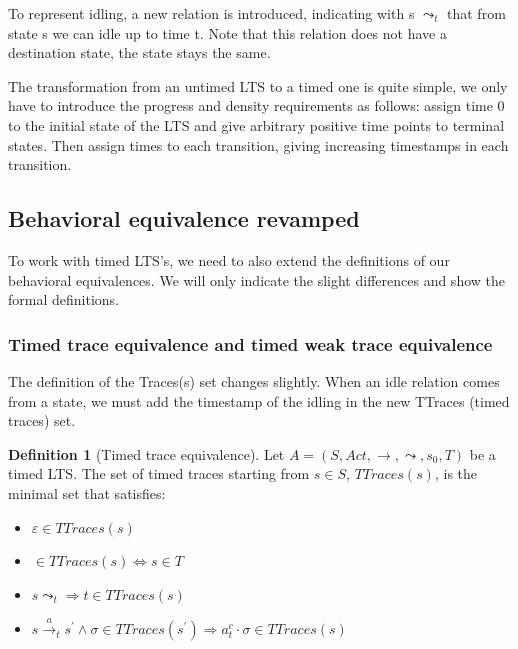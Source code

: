 \documentclass[11pt]{article}
\newcommand{\cmark}{\ding{51}}
\theoremstyle{definition}
\newtheorem{definition}{Definition}
\theoremstyle{plain}
\begin{document}
To represent idling, a new relation is introduced, indicating with s $ \leadsto_{t} $ that from state s we can idle up to time t. Note that this relation does not have a destination state, the state stays the same.

The transformation from an untimed LTS to a timed one is quite simple, we only have to introduce the progress and density requirements as follows: assign time 0 to the initial state of the LTS and give arbitrary positive time points to terminal states. Then assign times to each transition, giving increasing timestamps in each transition.

\subsection{Behavioral equivalence revamped}

To work with timed LTS's, we need to also extend the definitions of our behavioral equivalences. We will only indicate the slight differences and show the formal definitions.

\subsubsection{Timed trace equivalence and timed weak trace equivalence}

The definition of the Traces(s) set changes slightly. When an idle relation comes from a state, we must add the timestamp of the idling in the new TTraces (timed traces) set.

\begin{definition} [Timed trace equivalence]
	Let $ A = (S, Act, \rightarrow, \leadsto, s_0, T) $ be a timed LTS. The set of timed traces starting from $ s \in S$, $ TTraces(s) $, is the minimal set that satisfies:
	\begin{itemize}
		\item $ \varepsilon \in TTraces(s) $
		\item \cmark $ \in TTraces(s) \iff s \in T $
		\item $ s\leadsto_t \Rightarrow t \in TTraces(s) $
		\item $ s\xrightarrow{a}_t s^\prime \wedge \sigma \in TTraces(s^\prime) \Rightarrow a^c_t\cdot\sigma \in TTraces(s) $
	\end{itemize}
\end{definition}
\end{document}
